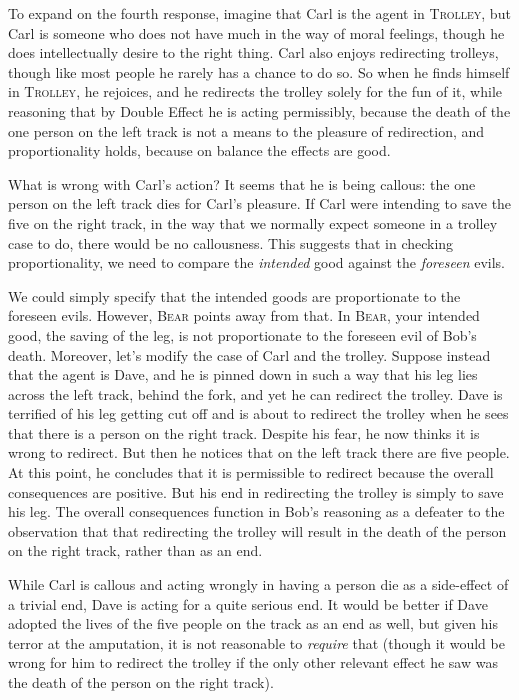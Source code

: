 To expand on the fourth response, imagine that Carl is the agent in \textsc{Trolley}, but Carl is someone who does not have much
in the way of moral feelings, though he does intellectually desire to the right thing. Carl also enjoys redirecting trolleys, 
though like most people he rarely has a chance to do so. So when he finds himself in \textsc{Trolley}, he rejoices, and he
redirects the trolley solely for the fun of it, while reasoning that by Double Effect he is acting permissibly, because the
death of the one person on the left track is not a means to the pleasure of redirection, and proportionality holds, because
on balance the effects are good. 

What is wrong with Carl's action? It seems that he is being callous: the one person on the left track dies for Carl's pleasure.
If Carl were intending to save the five on the right track, in the way that we normally expect someone in a trolley case to do, 
there would be no callousness. This suggests that in checking proportionality, we need to compare the \textit{intended} good 
against the \textit{foreseen} evils. 

We could simply specify that the intended goods are proportionate to the foreseen evils. However, \textsc{Bear} points away 
from that. In \textsc{Bear}, your intended good, the saving of the leg, is not proportionate to the foreseen evil of Bob's 
death. Moreover, let's modify the case of Carl and the trolley. Suppose instead that the agent is Dave, and he is pinned down
in such a way that his leg lies across the left track, behind the fork, and yet he can redirect the trolley. Dave is terrified
of his leg getting cut off and is about to redirect the trolley when he sees that there is a person on the right track. Despite
his fear, he now thinks it is wrong to redirect. But then he notices that on the left track there are five people. At this point,
he concludes that it is permissible to redirect because the overall consequences are positive. But his end in redirecting the
trolley is simply to save his leg. The overall consequences function in Bob's reasoning as a defeater to the 
observation that that redirecting the trolley will result in the death of the person on the right track, rather than as 
an end. 

While Carl is callous and acting wrongly in having a person die as a side-effect of a trivial end, Dave is acting for a quite
serious end. It would be better if Dave adopted the lives of the five people on the track as an end as well, but given his
terror at the amputation, it is not reasonable to \textit{require} that (though it would be wrong for him to redirect the
trolley if the only other relevant effect he saw was the death of the person on the right track).

